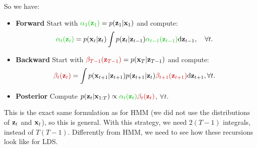 \vspace{3mm}

So we have:
\begin{itemize}
 \item \textbf{Forward} Start with $\paint{mygreen}{\alpha_1(\bs{z}_1)}=p(\bs{z}_1|\bs{x}_1)$ and compute:
 \begin{equation}
  \paint{mygreen}{\alpha_t(\bs{z}_t)} = p(\bs{x}_t|\bs{z}_t) \int p(\bs{z}_t|\bs{z}_{t-1}) \paint{mygreen}{\alpha_{t-1}(\bs{z}_{t-1})} \textrm{d}\bs{z}_{t-1}, \quad\forall t.\label{eq:lds-forward-compact}
 \end{equation}
 \item \textbf{Backward} Start with $\paint{myred}{\beta_{T-1}(\bs{z}_{T-1})}=p(\bs{x}_T|\bs{z}_{T-1})$ and compute:
 \begin{equation}
  \paint{myred}{\beta_{t}(\bs{z}_t)} = \int p(\bs{x}_{t+1}|\bs{z}_{t+1}) p(\bs{z}_{t+1}|\bs{z}_{t}) \paint{myred}{\beta_{t+1}(\bs{z}_{t+1})} \textrm{d}\bs{z}_{t+1}, \forall t.
  \label{eq:lds-backward-compact}
 \end{equation}
 \item \textbf{Posterior} Compute $p(\bs{z}_t|\bs{x}_{1:T})\propto \paint{mygreen}{\alpha_t(\bs{z}_t)}\paint{myred}{\beta_{t}(\bs{z}_t)}$, $\forall t$.
\end{itemize}
  
This is the exact same formulation as for HMM (we did not use the distributions of $\boldsymbol{\mathbf{z}}_t$ and $\boldsymbol{\mathbf{x}}_t$), so this is general. With this strategy, we need $2(T-1)$ integrals, instead of $T(T-1)$. Differently from HMM, we need to see how these recursions look like for LDS.
 
